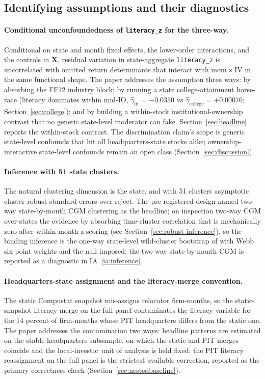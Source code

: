 \subsection{Identifying assumptions and their diagnostics}

\paragraph{Conditional unconfoundedness of \texttt{literacy\_z} for the three-way.} Conditional on state and month fixed effects, the lower-order interactions, and the controls in $\mathbf{X}$, residual variation in state-aggregate \texttt{literacy\_z} is uncorrelated with omitted return determinants that interact with $\mathrm{mom}\times\mathrm{IV}$ in the same functional shape. The paper addresses the assumption three ways: by absorbing the FF12 industry block; by running a state college-attainment horse-race (literacy dominates within mid-IO, $\hat\gamma_{\text{lit}} = -0.0350$ vs $\hat\gamma_{\text{college}} = +0.00076$; Section~\ref{sec:college}); and by building a within-stock institutional-ownership contrast that no generic state-level moderator can fake. Section~\ref{sec:headline} reports the within-stock contrast. The discrimination claim's scope is generic state-level confounds that hit all headquarters-state stocks alike; ownership-interactive state-level confounds remain an open class (Section~\ref{sec:discussion}).

\paragraph{Inference with 51 state clusters.} The natural clustering dimension is the state, and with 51 clusters asymptotic cluster-robust standard errors over-reject. The pre-registered design named two-way state-by-month CGM clustering as the headline; on inspection two-way CGM over-states the evidence by absorbing time-cluster correlation that is mechanically zero after within-month z-scoring (see Section~\ref{sec:robust-inference}), so the binding inference is the one-way state-level wild-cluster bootstrap of \citet{cameronGelbachMiller2008} with Webb six-point weights \citep{webb2014} and the null imposed; the two-way state-by-month CGM is reported as a diagnostic in IA~\ref{ia:inference}.

\paragraph{Headquarters-state assignment and the literacy-merge convention.} The static Compustat snapshot mis-assigns relocator firm-months, so the static-snapshot literacy merge on the full panel contaminates the literacy variable for the 14 percent of firm-months whose PIT headquarters differs from the static one. The paper addresses the contamination two ways: headline patterns are estimated on the stable-headquarters subsample, on which the static and PIT merges coincide and the local-investor unit of analysis is held fixed; the PIT literacy reassignment on the full panel is the strictest available correction, reported as the primary correctness check (Section~\ref{sec:nestedbaseline}).

